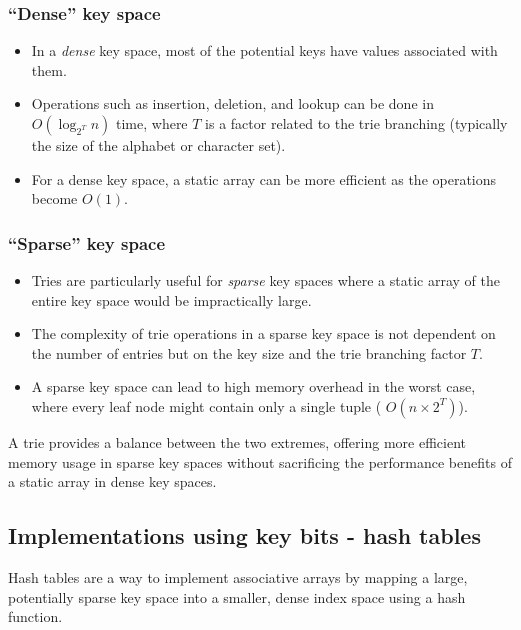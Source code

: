 \documentclass[12pt]{article}
\begin{document}
\subsubsection{``Dense'' key space}

\begin{itemize}
    \item In a \emph{dense} key space, most of the potential keys have values associated with them.
    \item Operations such as insertion, deletion, and lookup can be done in \( O(\log_{2^T} n) \) time, where \( T \) is a factor related to the trie branching (typically the size of the alphabet or character set).
    \item For a dense key space, a static array can be more efficient as the operations become \( O(1) \).
\end{itemize}

\subsubsection{``Sparse'' key space}

\begin{itemize}
    \item Tries are particularly useful for \emph{sparse} key spaces where a static array of the entire key space would be impractically large.
    \item The complexity of trie operations in a sparse key space is not dependent on the number of entries but on the key size and the trie branching factor \( T \).
    \item A sparse key space can lead to high memory overhead in the worst case, where every leaf node might contain only a single tuple ( $O(n \times 2^T)$).
\end{itemize}
A trie provides a balance between the two extremes, offering more efficient memory usage in sparse key spaces without sacrificing the performance benefits of a static array in dense key spaces.

\subsection{Implementations using key bits - hash tables}
Hash tables are a way to implement associative arrays by mapping a large, potentially sparse key space into a smaller, dense index space using a hash function.
\end{document}
